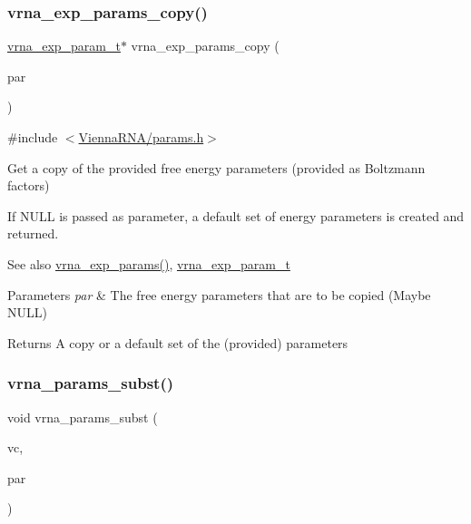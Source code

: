 \subsubsection{\texorpdfstring{vrna\+\_\+exp\+\_\+params\+\_\+copy()}{vrna\_exp\_params\_copy()}}
{\footnotesize\ttfamily \mbox{\hyperlink{group__energy__parameters_ga01d8b92fe734df8d79a6169482c7d8d8}{vrna\+\_\+exp\+\_\+param\+\_\+t}}$\ast$ vrna\+\_\+exp\+\_\+params\+\_\+copy (\begin{DoxyParamCaption}\item[{\mbox{\hyperlink{group__energy__parameters_ga01d8b92fe734df8d79a6169482c7d8d8}{vrna\+\_\+exp\+\_\+param\+\_\+t}} $\ast$}]{par }\end{DoxyParamCaption})}



{\ttfamily \#include $<$\mbox{\hyperlink{params_8h}{Vienna\+R\+N\+A/params.\+h}}$>$}



Get a copy of the provided free energy parameters (provided as Boltzmann factors) 

If N\+U\+LL is passed as parameter, a default set of energy parameters is created and returned.

\begin{DoxySeeAlso}{See also}
\mbox{\hyperlink{group__energy__parameters_gab1f3016f96aa96bff020cdd904605afa}{vrna\+\_\+exp\+\_\+params()}}, \mbox{\hyperlink{group__energy__parameters_ga01d8b92fe734df8d79a6169482c7d8d8}{vrna\+\_\+exp\+\_\+param\+\_\+t}}
\end{DoxySeeAlso}

\begin{DoxyParams}{Parameters}
{\em par} & The free energy parameters that are to be copied (Maybe N\+U\+LL) \\
\hline
\end{DoxyParams}
\begin{DoxyReturn}{Returns}
A copy or a default set of the (provided) parameters 
\end{DoxyReturn}
\mbox{\label{group__energy__parameters_ga5d1909208f7ea3baa98b75afaa1f62ca}} 
\subsubsection{\texorpdfstring{vrna\+\_\+params\+\_\+subst()}{vrna\_params\_subst()}}
{\footnotesize\ttfamily void vrna\+\_\+params\+\_\+subst (\begin{DoxyParamCaption}\item[{\mbox{\hyperlink{group__fold__compound_ga1b0cef17fd40466cef5968eaeeff6166}{vrna\+\_\+fold\+\_\+compound\+\_\+t}} $\ast$}]{vc,  }\item[{\mbox{\hyperlink{group__energy__parameters_ga8a69ca7d787e4fd6079914f5343a1f35}{vrna\+\_\+param\+\_\+t}} $\ast$}]{par }\end{DoxyParamCaption})}




